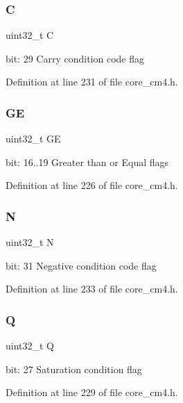 \subsubsection{\texorpdfstring{C}{C}}
{\footnotesize\ttfamily uint32\+\_\+t C}

bit\+: 29 Carry condition code flag 

Definition at line 231 of file core\+\_\+cm4.\+h.

\mbox{\label{union_a_p_s_r___type_aa91800ec6e90e457c7a1acd1f2e17099}} 
\subsubsection{\texorpdfstring{GE}{GE}}
{\footnotesize\ttfamily uint32\+\_\+t GE}

bit\+: 16..19 Greater than or Equal flags 

Definition at line 226 of file core\+\_\+cm4.\+h.

\mbox{\label{union_a_p_s_r___type_abae0610bc2a97bbf7f689e953e0b451f}} 
\subsubsection{\texorpdfstring{N}{N}}
{\footnotesize\ttfamily uint32\+\_\+t N}

bit\+: 31 Negative condition code flag 

Definition at line 233 of file core\+\_\+cm4.\+h.

\mbox{\label{union_a_p_s_r___type_a65f27ddc4f7e09c14ce7c5211b2e000a}} 
\subsubsection{\texorpdfstring{Q}{Q}}
{\footnotesize\ttfamily uint32\+\_\+t Q}

bit\+: 27 Saturation condition flag 

Definition at line 229 of file core\+\_\+cm4.\+h.

